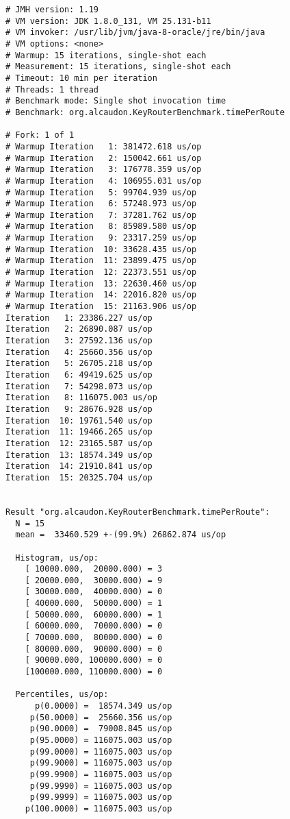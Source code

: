 \begin{lstlisting}
# JMH version: 1.19
# VM version: JDK 1.8.0_131, VM 25.131-b11
# VM invoker: /usr/lib/jvm/java-8-oracle/jre/bin/java
# VM options: <none>
# Warmup: 15 iterations, single-shot each
# Measurement: 15 iterations, single-shot each
# Timeout: 10 min per iteration
# Threads: 1 thread
# Benchmark mode: Single shot invocation time
# Benchmark: org.alcaudon.KeyRouterBenchmark.timePerRoute

# Fork: 1 of 1
# Warmup Iteration   1: 381472.618 us/op
# Warmup Iteration   2: 150042.661 us/op
# Warmup Iteration   3: 176778.359 us/op
# Warmup Iteration   4: 106955.031 us/op
# Warmup Iteration   5: 99704.939 us/op
# Warmup Iteration   6: 57248.973 us/op
# Warmup Iteration   7: 37281.762 us/op
# Warmup Iteration   8: 85989.580 us/op
# Warmup Iteration   9: 23317.259 us/op
# Warmup Iteration  10: 33628.435 us/op
# Warmup Iteration  11: 23899.475 us/op
# Warmup Iteration  12: 22373.551 us/op
# Warmup Iteration  13: 22630.460 us/op
# Warmup Iteration  14: 22016.820 us/op
# Warmup Iteration  15: 21163.906 us/op
Iteration   1: 23386.227 us/op
Iteration   2: 26890.087 us/op
Iteration   3: 27592.136 us/op
Iteration   4: 25660.356 us/op
Iteration   5: 26705.218 us/op
Iteration   6: 49419.625 us/op
Iteration   7: 54298.073 us/op
Iteration   8: 116075.003 us/op
Iteration   9: 28676.928 us/op
Iteration  10: 19761.540 us/op
Iteration  11: 19466.265 us/op
Iteration  12: 23165.587 us/op
Iteration  13: 18574.349 us/op
Iteration  14: 21910.841 us/op
Iteration  15: 20325.704 us/op


Result "org.alcaudon.KeyRouterBenchmark.timePerRoute":
  N = 15
  mean =  33460.529 +-(99.9%) 26862.874 us/op

  Histogram, us/op:
    [ 10000.000,  20000.000) = 3
    [ 20000.000,  30000.000) = 9
    [ 30000.000,  40000.000) = 0
    [ 40000.000,  50000.000) = 1
    [ 50000.000,  60000.000) = 1
    [ 60000.000,  70000.000) = 0
    [ 70000.000,  80000.000) = 0
    [ 80000.000,  90000.000) = 0
    [ 90000.000, 100000.000) = 0
    [100000.000, 110000.000) = 0

  Percentiles, us/op:
      p(0.0000) =  18574.349 us/op
     p(50.0000) =  25660.356 us/op
     p(90.0000) =  79008.845 us/op
     p(95.0000) = 116075.003 us/op
     p(99.0000) = 116075.003 us/op
     p(99.9000) = 116075.003 us/op
     p(99.9900) = 116075.003 us/op
     p(99.9990) = 116075.003 us/op
     p(99.9999) = 116075.003 us/op
    p(100.0000) = 116075.003 us/op
\end{lstlisting}

